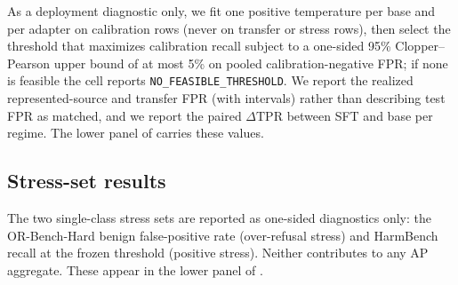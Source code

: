 \documentclass[sigconf,nonacm]{acmart}
\begin{document}
As a deployment diagnostic only, we fit one positive temperature per base and per adapter on calibration rows (never on transfer or stress rows), then select the threshold that maximizes calibration recall subject to a one-sided 95\% Clopper--Pearson upper bound of at most 5\% on pooled calibration-negative FPR; if none is feasible the cell reports \texttt{NO\_FEASIBLE\_THRESHOLD}. We report the realized represented-source and transfer FPR (with intervals) rather than describing test FPR as matched, and we report the paired $\Delta\mathrm{TPR}$ between SFT and base per regime. The lower panel of  carries these values.

\subsection{Stress-set results}
\label{subsec:stress}

The two single-class stress sets are reported as one-sided diagnostics only: the OR-Bench-Hard benign false-positive rate (over-refusal stress) and HarmBench recall at the frozen threshold (positive stress). Neither contributes to any AP aggregate. These appear in the lower panel of .
\end{document}
